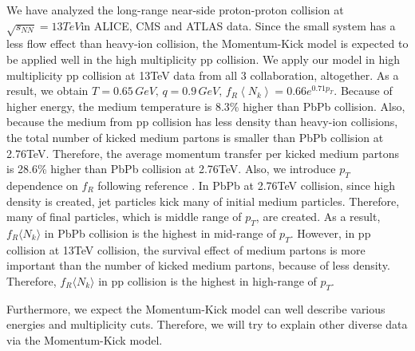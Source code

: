 \documentclass[%
 reprint,
 amsmath,amssymb,
 aps,
]{revtex4-2}
\begin{document}
We have analyzed the long-range near-side proton-proton collision at $\sqrt{s_{NN}}=13TeV $in ALICE, CMS and ATLAS data. 
Since the small system has a less flow effect than heavy-ion collision, the Momentum-Kick model is expected to be applied well in the high multiplicity pp collision. 
We apply our model in high multiplicity pp collision at 13TeV data from all 3 collaboration, altogether. 
As a result, we obtain $T=0.65\, GeV,\, q=0.9\, GeV,\, f_R\left\langle N_k\right\rangle=0.66e^{0.71p_T}$.
Because of higher energy, the medium temperature is 8.3\% higher than PbPb collision.
Also, because the medium from pp collision has less density than heavy-ion collisions, the total number of kicked medium partons is smaller than PbPb collision at 2.76TeV.
Therefore, the average momentum transfer per kicked medium partons is 28.6\% higher than PbPb collision at 2.76TeV.
Also, we introduce $p_T$ dependence on $f_R$ following reference \cite{PbPb}.
In PbPb at 2.76TeV collision, since high density is created, jet particles kick many of initial medium particles.
Therefore, many of final particles, which is middle range of $p_T$, are created.
As a result, $f_R \langle N_k \rangle$ in PbPb collision is the highest in mid-range of $p_T$.
However, in pp collision at 13TeV collision, the survival effect of medium partons is more important than the number of kicked medium partons, because of less density.
Therefore, $f_R \langle N_k \rangle$ in pp collision is the highest in high-range of $p_T$.

Furthermore, we expect the Momentum-Kick model can well describe various energies and multiplicity cuts. 
Therefore, we will try to explain other diverse data via the Momentum-Kick model.

\end{document}
